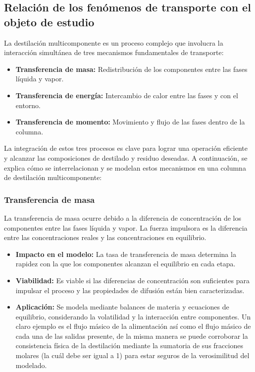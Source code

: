 \subsection{Relación de los fenómenos de transporte con el objeto de estudio}
La destilación multicomponente es un proceso complejo que involucra la interacción simultánea de tres mecanismos fundamentales de transporte:

\begin{itemize}
    \item \textbf{Transferencia de masa:} Redistribución de los componentes entre las fases líquida y vapor.
    \item \textbf{Transferencia de energía:} Intercambio de calor entre las fases y con el entorno.
    \item \textbf{Transferencia de momento:} Movimiento y flujo de las fases dentro de la columna.
\end{itemize}

La integración de estos tres procesos es clave para lograr una operación eficiente y alcanzar las composiciones de destilado y residuo deseadas. A continuación, se explica cómo se interrelacionan y se modelan estos mecanismos en una columna de destilación multicomponente:

\subsubsection{Transferencia de masa}
La transferencia de masa ocurre debido a la diferencia de concentración de los componentes entre las fases líquida y vapor. La fuerza impulsora es la diferencia entre las concentraciones reales y las concentraciones en equilibrio.
\begin{itemize}
    \item \textbf{Impacto en el modelo:} La tasa de transferencia de masa determina la rapidez con la que los componentes alcanzan el equilibrio en cada etapa.
    \item \textbf{Viabilidad:} Es viable si las diferencias de concentración son suficientes para impulsar el proceso y las propiedades de difusión están bien caracterizadas.
    \item \textbf{Aplicación:} Se modela mediante balances de materia y ecuaciones de equilibrio, considerando la volatilidad y la interacción entre componentes. Un claro ejemplo es el flujo másico de la alimentación así como el flujo másico de cada una de las salidas presente, de la misma manera se puede corroborar la consistencia física de la destilación mediante la sumatoria de sus fracciones molares (la cuál debe ser igual a 1) para estar seguros de la verosimilitud del modelado.
\end{itemize}

